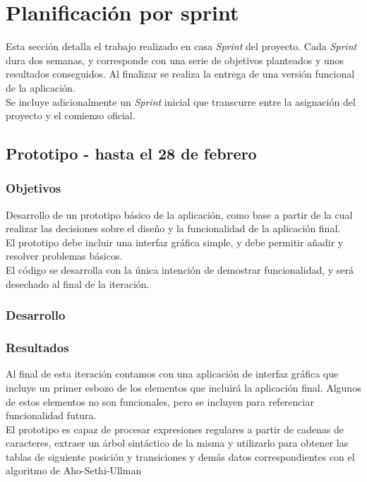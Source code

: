 
\section{Planificación por sprint}
Esta sección detalla el trabajo realizado en casa \textit{Sprint} del proyecto. Cada \textit{Sprint} dura dos semanas, y corresponde con una serie de objetivos planteados y unos resultados conseguidos.
Al finalizar se realiza la entrega de una versión funcional de la aplicación.
\\
Se incluye adicionalmente un \textit{Sprint} inicial que transcurre entre la asignación del proyecto y el comienzo oficial.

\subsection{Prototipo - hasta el 28 de febrero}

\subsubsection{Objetivos}
Desarrollo de un prototipo básico de la aplicación, como base a partir de la cual realizar las decisiones sobre el diseño y la funcionalidad de la aplicación final.
\\
El prototipo debe incluir una interfaz gráfica simple, y debe permitir añadir y resolver problemas básicos. \\
El código se desarrolla con la única intención de demostrar funcionalidad, y será desechado al final de la iteración.

\subsubsection{Desarrollo}

\subsubsection{Resultados}
Al final de esta iteración contamos con una aplicación de interfaz gráfica que incluye un primer esbozo de los elementos que incluirá la aplicación final.
Algunos de estos elementos no son funcionales, pero se incluyen para referenciar funcionalidad futura.
\\
El prototipo es capaz de procesar expresiones regulares a partir de cadenas de caracteres, extraer un árbol sintáctico de la misma y utilizarlo para obtener las tablas de siguiente posición y transiciones y demás datos correspondientes con el algoritmo de Aho-Sethi-Ullman

